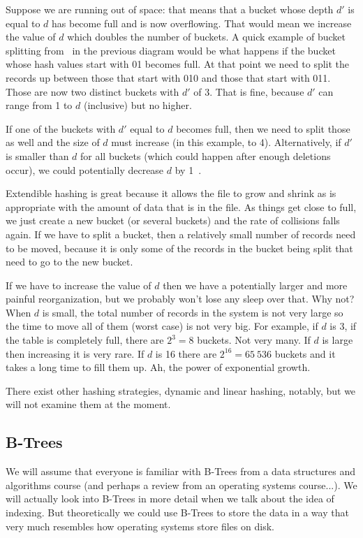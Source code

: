 Suppose we are running out of space: that means that a bucket whose depth $d'$ is equal to $d$ has become full and is now overflowing. That would mean we increase the value of $d$ which doubles the number of buckets. A quick example of bucket splitting from~\cite{fds} in the previous diagram would be what happens if the bucket whose hash values start with 01 becomes full. At that point we need to split the records up between those that start with 010 and those that start with 011. Those are now two distinct buckets with $d'$ of 3. That is fine, because $d'$ can range from 1 to $d$ (inclusive) but no higher.  

If one of the buckets with $d'$ equal to $d$ becomes full, then we need to split those as well and the size of $d$ must increase (in this example, to 4). Alternatively, if $d'$ is smaller than $d$ for all buckets (which could happen after enough deletions occur), we could potentially decrease $d$ by 1~\cite{fds}.

Extendible hashing is great because it allows the file to grow and shrink as is appropriate with the amount of data that is in the file. As things get close to full, we just create a new bucket (or several buckets) and the rate of collisions falls again. If we have to split a bucket, then a relatively small number of records need to be moved, because it is only some of the records in the bucket being split that need to go to the new bucket. 

If we have to increase the value of $d$ then we have a potentially larger and more painful reorganization, but we probably won't lose any sleep over that. Why not? When $d$ is small, the total number of records in the system is not very large so the time to move all of them (worst case) is not very big. For example, if $d$ is 3, if the table is completely full, there are $2^{3} = 8$ buckets. Not very many. If $d$ is large then increasing it is very rare. If $d$ is 16 there are $2^{16} = 65~536$ buckets and it takes a long time to fill them up. Ah, the power of exponential growth.


There exist other hashing strategies, dynamic and linear hashing, notably, but we will not examine them at the moment.

\subsection*{B-Trees}

We will assume that everyone is familiar with B-Trees from a data structures and algorithms course (and perhaps a review from an operating systems course...). We will actually look into B-Trees in more detail when we talk about the idea of indexing. But theoretically we could use B-Trees to store the data in a way that very much resembles how operating systems store files on disk.


